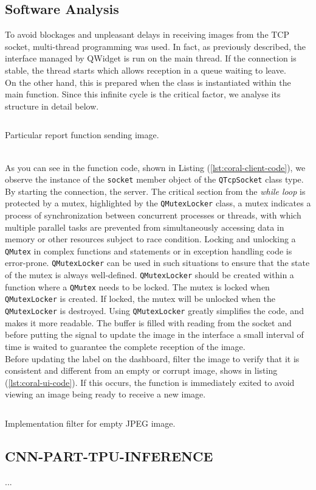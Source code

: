 \subsection{Software Analysis}
\label{ssec:software-coral-analysis}
To avoid blockages and unpleasant delays in receiving images from the TCP
socket, multi-thread programming was used. In fact, as previously described, the
interface managed by QWidget is run on the main thread. If the connection is
stable, the thread starts which allows reception in a queue waiting to leave.\\ 
On the other hand, this is prepared when the class is instantiated within the
main function. Since this infinite cycle is the critical factor, we analyse its
structure in detail below.
%
\begin{listing}[ht] 
\inputminted[frame=lines,framesep=2mm, linenos=true, autogobble, breaklines=true, fontsize=\scriptsize, firstline=12, lastline=26]{c++}{software/code/streamerthread.cpp} 
\caption{Particular report function sending image.} 
\label{lst:coral-client-code} 
\end{listing}
%
\\As you can see in the function code, shown in Listing
(\ref{lst:coral-client-code}), we observe the instance of the \texttt{socket}
member object of the \texttt{QTcpSocket} class type. 
By starting the connection, the server. 
The critical section from the \emph{while loop} is protected by a mutex,
highlighted by the \texttt{QMutexLocker} class, a mutex indicates a
process of synchronization between concurrent processes or threads, with which
multiple parallel tasks are prevented from simultaneously accessing 
data in memory or other resources subject to race condition.\cite{wiki:mutex} \hfill \break
Locking and unlocking a \texttt{QMutex} in complex functions and statements or
in exception handling code is error-prone.
\texttt{QMutexLocker} can be used in such situations to ensure that the state of the
mutex is always well-defined. \texttt{QMutexLocker} should be created within a
function where a \texttt{QMutex} needs to be locked. The mutex is locked when
\texttt{QMutexLocker} is created. If locked, the mutex will be unlocked when
the \texttt{QMutexLocker} is destroyed.
Using \texttt{QMutexLocker} greatly simplifies the code, and makes it more
readable.\cite{Qt:QMutexclass} \hfill \break
The buffer is filled with reading from the socket and before putting the signal
to update the image in the interface a small interval of time is waited to
guarantee the complete reception of the image.\\
Before updating the label on the dashboard, filter the image to verify that it
is consistent and different from an empty or corrupt image, shows in listing
(\ref{lst:coral-ui-code}). 
If this occurs, the function is immediately exited to
avoid viewing an image being ready to receive a new image. 
%
\begin{listing}[ht] 
\inputminted[frame=lines,framesep=2mm, linenos=true, autogobble, breaklines=true, fontsize=\scriptsize, firstline=88, lastline=100]{c++}{software/code/tcpclient.cpp} 
\caption{Implementation filter for empty JPEG image.} 
\label{lst:coral-ui-code} 
\end{listing}
%
\subsection{CNN-PART-TPU-INFERENCE}
...
